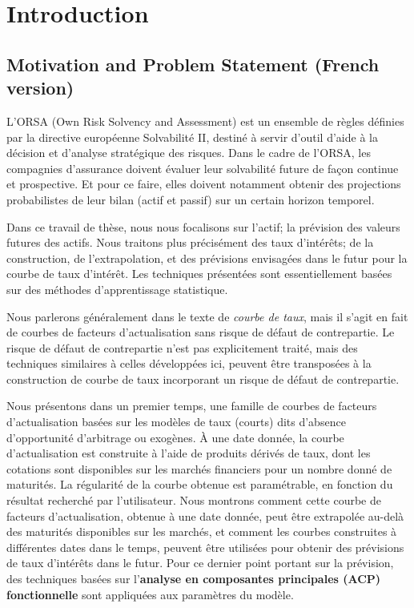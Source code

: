 %

\chapter{Introduction}
\label{sec:intro}

\section{Motivation and Problem Statement (French version)}

L'ORSA (Own Risk Solvency and Assessment) est un ensemble de règles définies par la directive européenne Solvabilit\'e II, destiné à servir d'outil d'aide à la décision et d'analyse stratégique des risques. Dans le cadre de l'ORSA, les compagnies d'assurance doivent évaluer leur solvabilité future de façon continue et prospective. Et pour ce faire, elles doivent notamment obtenir des projections probabilistes de leur bilan (actif et passif) sur un certain horizon temporel.   

Dans ce travail de thèse, nous nous focalisons sur l'actif; la prévision des valeurs futures des actifs. Nous traitons plus précisément des taux d'intérêts; de la construction, de l'extrapolation, et des prévisions envisagées dans le futur pour la courbe de taux d'intérêt. Les techniques présentées sont essentiellement basées sur des méthodes d'apprentissage statistique.    

Nous parlerons généralement dans le texte de \textit{courbe de taux}, mais il s'agit en fait  de courbes de facteurs d'actualisation sans risque de défaut de contrepartie. Le risque de défaut de contrepartie n'est pas explicitement traité, mais des techniques similaires à celles développées ici, peuvent être transposées à la construction de courbe de taux incorporant un risque de défaut de contrepartie.

Nous présentons dans un premier temps, une famille de courbes de facteurs d'actualisation basées sur les modèles de taux (courts) dits d'absence d'opportunité d'arbitrage ou exogènes. À une date donnée, la courbe d'actualisation est construite à l'aide de produits dérivés de taux, dont les cotations sont disponibles sur les marchés financiers pour un nombre donné de maturités. La régularité de la courbe obtenue est  paramétrable, en fonction du résultat recherché par l'utilisateur. Nous montrons comment cette courbe de facteurs d'actualisation, obtenue à une date donnée, peut être extrapolée au-delà des maturités disponibles sur les marchés, et comment les courbes construites à différentes dates dans le temps, peuvent être utilisées pour obtenir des prévisions de taux d'intérêts dans le futur.  Pour ce dernier point portant sur la prévision, des techniques basées sur l'\textbf{analyse en composantes principales (ACP) fonctionnelle} sont appliquées aux paramètres du modèle. 

